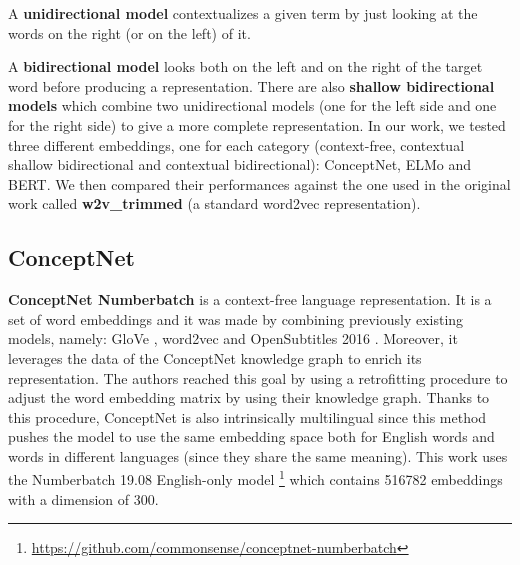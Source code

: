\documentclass[11pt,a4paper]{article}
\begin{document}
A \textbf{unidirectional model} contextualizes a given term by just looking at the words on the right (or on the left) of it.  

A \textbf{bidirectional model} looks both on the left and on the right of the target word before producing a representation. There are also \textbf{shallow bidirectional models} which combine two unidirectional models (one for the left side and one for the right side) to give a more complete representation. In our work, we tested three different embeddings, one for each category (context-free, contextual shallow bidirectional and contextual bidirectional): ConceptNet, ELMo and BERT. We then compared their performances against the one used in the original work called \textbf{w2v\_trimmed} (a standard word2vec representation).

\subsection{ConceptNet}
\textbf{ConceptNet Numberbatch} \cite{speer2017conceptnet} is a context-free language representation. It is a set of word embeddings and it was made by combining previously existing models, namely: GloVe \cite{pennington2014glove}, word2vec \cite{mikolov2013efficient} and OpenSubtitles 2016 \cite{Lison2016OpenSubtitles2016EL}. Moreover, it leverages the data of the ConceptNet knowledge graph to enrich its representation. The authors reached this goal by using a retrofitting procedure to adjust the word embedding matrix by using their knowledge graph. Thanks to this procedure, ConceptNet is also intrinsically multilingual since this method pushes the model to use the same embedding space both for English words and words in different languages (since they share the same meaning).  This work uses the Numberbatch 19.08 English-only model \footnote{\url{https://github.com/commonsense/conceptnet-numberbatch}} which contains 516782 embeddings with a dimension of 300.
\end{document}
